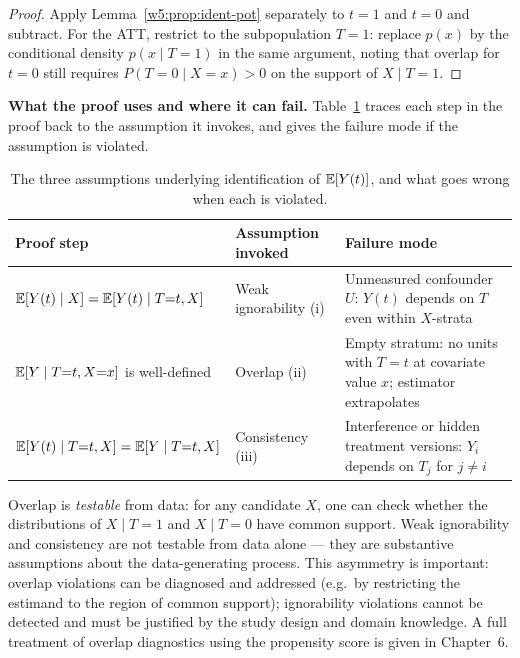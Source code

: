\documentclass[master.tex]{subfiles}
\begin{document}
\begin{proof}
Apply Lemma~\ref{w5:prop:ident-pot} separately to $t = 1$ and
$t = 0$ and subtract.  For the ATT, restrict to the subpopulation
$T = 1$: replace $p(x)$ by the conditional density $p(x \mid T{=}1)$
in the same argument, noting that overlap for $t = 0$ still requires
$P(T{=}0 \mid X{=}x) > 0$ on the support of $X \mid T{=}1$.
\end{proof}

\medskip\noindent\textbf{What the proof uses and where it can fail.}
Table~\ref{w5:tab:ident-steps} traces each step in the proof back to
the assumption it invokes, and gives the failure mode if the assumption
is violated.

\begin{table}[h]
\centering
\renewcommand{\arraystretch}{1.5}
\begin{tabular}{p{3.5cm} p{4.0cm} p{4.8cm}}
\toprule
\textbf{Proof step} & \textbf{Assumption invoked} & \textbf{Failure mode} \\
\midrule
$\mathbb{E}[Y(t) \mid X] = \mathbb{E}[Y(t) \mid T{=}t, X]$
  & Weak ignorability (i)
  & Unmeasured confounder $U$: $Y(t)$ depends on $T$ even within $X$-strata \\
$\mathbb{E}[Y \mid T{=}t, X{=}x]$ is well-defined
  & Overlap (ii)
  & Empty stratum: no units with $T{=}t$ at covariate value $x$; estimator extrapolates \\
$\mathbb{E}[Y(t) \mid T{=}t, X] = \mathbb{E}[Y \mid T{=}t, X]$
  & Consistency (iii)
  & Interference or hidden treatment versions: $Y_i$ depends on $T_j$ for $j \ne i$ \\
\bottomrule
\end{tabular}
\caption{The three assumptions underlying identification of $\mathbb{E}[Y(t)]$,
and what goes wrong when each is violated.}
\label{w5:tab:ident-steps}
\end{table}

\begin{remark}
Overlap is \emph{testable} from data: for any candidate $X$, one can
check whether the distributions of $X \mid T{=}1$ and $X \mid T{=}0$
have common support.  Weak ignorability and consistency are not
testable from data alone --- they are substantive assumptions about the
data-generating process.  This asymmetry is important: overlap
violations can be diagnosed and addressed (e.g.\ by restricting the
estimand to the region of common support); ignorability violations
cannot be detected and must be justified by the study design and domain
knowledge.  A full treatment of overlap diagnostics using the
propensity score is given in Chapter~6.
\end{remark}
\end{document}

